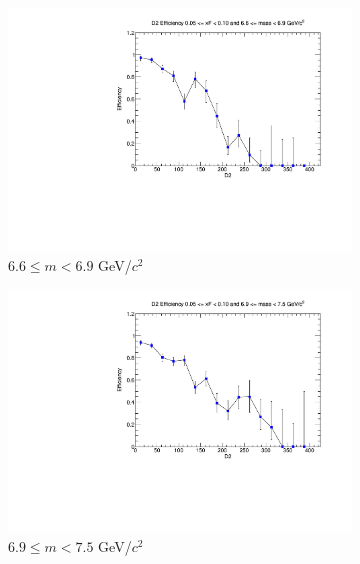 \begin{figure}[p]
\begin{subfigure}[b]{0.32\textwidth}
        \includegraphics[width=\textwidth]{./kTrackerEfficiencyPlots/D2_Efficiency_xF1_mass8.pdf}
        \caption{$6.6 \leq m < 6.9$ GeV/$c^2$}
        \label{fig:xF1_mass8}
    \end{subfigure}
    \vspace{0.5cm}
    \begin{subfigure}[b]{0.32\textwidth}
        \centering
        \includegraphics[width=\textwidth]{./kTrackerEfficiencyPlots/D2_Efficiency_xF1_mass9.pdf}
        \caption{$6.9 \leq m < 7.5$ GeV/$c^2$}
        \label{fig:xF1_mass9}
    \end{subfigure}
    \hfill
    \begin{subfigure}[b]{0.32\textwidth}
        \centering

\end{subfigure}
\end{figure}

